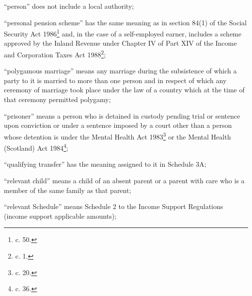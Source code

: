 \documentclass[a4paper]{article}
\begin{document}
\begin{enumerate}
“person” does not include a local authority;

“personal pension scheme” has the same meaning as in section 84(1) of the Social Security Act 1986\footnote{ c. 50.} and, in the case of a self-employed earner, includes a scheme approved by the Inland Revenue under Chapter IV of Part XIV of the Income and Corporation Taxes Act 1988\footnote{ c. 1.};

“polygamous marriage” means any marriage during the subsistence of which a party to it is married to more than one person and in respect of which any ceremony of marriage took place under the law of a country which at the time of that ceremony permitted polygamy;

“prisoner” means a person who is detained in custody pending trial or sentence upon conviction or under a sentence imposed by a court other than a person whose detention is under the Mental Health Act 1983\footnote{ c. 20.} or the Mental Health (Scotland) Act 1984\footnote{ c. 36.};

“qualifying transfer” has the meaning assigned to it in Schedule 3A;

“relevant child” means a child of an absent parent or a parent with care who is a member of the same family as that parent;

“relevant Schedule” means Schedule 2 to the Income Support Regulations (income support applicable amounts);

%
%


\end{enumerate}
\end{document}
